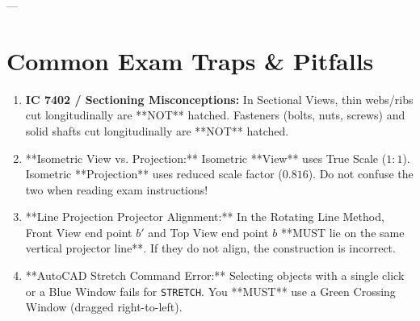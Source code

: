 ---

\section{Common Exam Traps \& Pitfalls}
\begin{enumerate}
    \item \textbf{IC 7402 / Sectioning Misconceptions:}  
    In Sectional Views, thin webs/ribs cut longitudinally are **NOT** hatched. Fasteners (bolts, nuts, screws) and solid shafts cut longitudinally are **NOT** hatched.
    \item **Isometric View vs. Projection:**  
    Isometric **View** uses True Scale ($1:1$). Isometric **Projection** uses reduced scale factor ($0.816$). Do not confuse the two when reading exam instructions!
    \item **Line Projection Projector Alignment:**  
    In the Rotating Line Method, Front View end point $b'$ and Top View end point $b$ **MUST lie on the same vertical projector line**. If they do not align, the construction is incorrect.
    \item **AutoCAD Stretch Command Error:**  
    Selecting objects with a single click or a Blue Window fails for \texttt{STRETCH}. You **MUST** use a Green Crossing Window (dragged right-to-left).
\end{enumerate}
